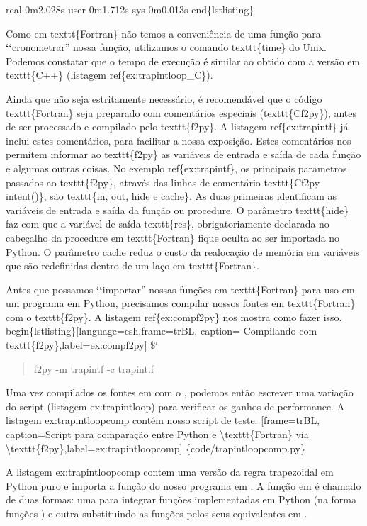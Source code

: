 \documentclass[a4paper,10pt,brazil]{sphinxmanual}
\begin{document}
real    0m2.028s
user    0m1.712s
sys     0m0.013s
end\{lstlisting\}

Como em texttt\{Fortran\} não temos a conveniência de uma função para {\color{red}\bfseries{}{}`{}`}cronometrar'' nossa função, utilizamos o comando texttt\{time\} do Unix. Podemos constatar que o tempo de execução é similar ao obtido com a versão em texttt\{C++\} (listagem ref\{ex:trapintloop\_C\}).

Ainda que não seja estritamente necessário, é recomendável que o código texttt\{Fortran\} seja preparado com comentários especiais (texttt\{Cf2py\}), antes de ser processado e compilado pelo texttt\{f2py\}. A listagem ref\{ex:trapintf\} já inclui estes comentários, para facilitar a nossa exposição. Estes comentários nos permitem informar ao texttt\{f2py\} as variáveis de entrada e saída de cada função e algumas outras coisas. No exemplo ref\{ex:trapintf\}, os principais parametros passados ao texttt\{f2py\}, através das linhas de comentário texttt\{Cf2py intent()\}, são texttt\{in, out, hide e cache\}. As duas primeiras identificam as variáveis de entrada e saída da função ou procedure. O parâmetro texttt\{hide\} faz com que a variável de saída texttt\{res\}, obrigatoriamente declarada no cabeçalho da procedure em texttt\{Fortran\} fique oculta ao ser importada no Python. O parâmetro cache reduz o custo da realocação de  memória em variáveis que são redefinidas dentro de um laço em texttt\{Fortran\}.

Antes que possamos {\color{red}\bfseries{}{}`{}`}importar'' nossas funções em texttt\{Fortran\} para uso em um programa em Python, precisamos compilar nossos fontes em texttt\{Fortran\} com o texttt\{f2py\}. A listagem ref\{ex:compf2py\} nos mostra como fazer isso.
begin\{lstlisting\}{[}language=csh,frame=trBL, caption= Compilando com texttt\{f2py\},label=ex:compf2py{]}
\${}`
\begin{quote}

f2py -m trapintf -c trapint.f
\end{quote}

Uma vez compilados os fontes em  com o , podemos
então escrever uma variação do script  (listagem
ex:trapintloop) para verificar os ganhos de performance. A listagem
ex:trapintloopcomp contém nosso script de teste.
{[}frame=trBL, caption=Script para comparação entre Python e \textbackslash{}texttt\{Fortran\} via \textbackslash{}texttt\{f2py\},label=ex:trapintloopcomp{]} \{code/trapintloopcomp.py\}

A listagem ex:trapintloopcomp contem uma versão da regra
trapezoidal em Python puro e importa a função  do nosso
programa em . A função em  é chamado de duas
formas: uma para integrar funções implementadas em Python (na forma
funções ) e outra substituindo as funções 
pelos seus equivalentes em .
\end{document}

